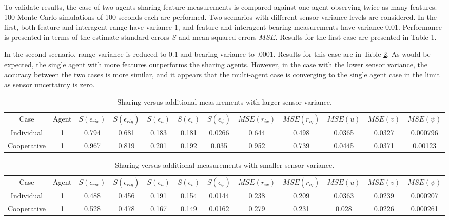 \documentclass{aiaa-tc}
\begin{document}
To validate results, the case of two agents sharing feature measurements is compared against one agent observing twice as many features. 100 Monte Carlo simulations of 100 seconds each are performed. Two scenarios with different sensor variance levels are considered. In the first, both feature and interagent range have variance $1$, and feature and interagent bearing measurements have variance $0.01$. Performance is presented in terms of the estimate standard errors $S$ and mean squared errors $MSE$. Results for the first case are presented in Table \ref{tab:case1}.

In the second scenario, range variance is reduced to $0.1$ and bearing variance to $.0001$. Results for this case are in Table \ref{tab:case2}. As would be expected, the single agent with more features outperforms the sharing agents. However, in the case with the lower sensor variance, the accuracy between the two cases is more similar, and it appears that the multi-agent case is converging to the single agent case in the limit as sensor uncertainty is zero.

\begin{table}[tb!]
\scriptsize
\centering
\begin{tabular}{c|c|c|c|c|c|c|c|c|c|c|c|}
Case & Agent & $S(\epsilon_{rix})$ & $S(\epsilon_{riy})$ & $S(\epsilon_{u})$ & $S(\epsilon_{v})$ & $S(\epsilon_{\psi})$ & $MSE(r_{ix})$ & $MSE(r_{iy})$ & $MSE(u)$ & $MSE(v)$ & $MSE(\psi)$ \\
Individual & 1& 0.794& 0.681& 0.183& 0.181& 0.0266& 0.644& 0.498& 0.0365& 0.0327& 0.000796 \\
Cooperative & 1& 0.967& 0.819& 0.201& 0.192& 0.035& 0.952& 0.739& 0.0445& 0.0371& 0.00123 \\
\end{tabular}
\caption{Sharing versus additional measurements with larger sensor variance.}
\label{tab:case1}
\end{table}

\begin{table}[tb!]
\scriptsize
\centering
\begin{tabular}{c|c|c|c|c|c|c|c|c|c|c|c|}
Case & Agent & $S(\epsilon_{rix})$ & $S(\epsilon_{riy})$ & $S(\epsilon_{u})$ & $S(\epsilon_{v})$ & $S(\epsilon_{\psi})$ & $MSE(r_{ix})$ & $MSE(r_{iy})$ & $MSE(u)$ & $MSE(v)$ & $MSE(\psi)$ \\
Individual & 1& 0.488& 0.456& 0.191& 0.154& 0.0144& 0.238& 0.209& 0.0363& 0.0239& 0.000207 \\
Cooperative & 1& 0.528& 0.478& 0.167& 0.149& 0.0162& 0.279& 0.231& 0.028& 0.0226& 0.000261 \\
\end{tabular}
\caption{Sharing versus additional measurements with smaller sensor variance.}
\label{tab:case2}
\end{table}
\end{document}
